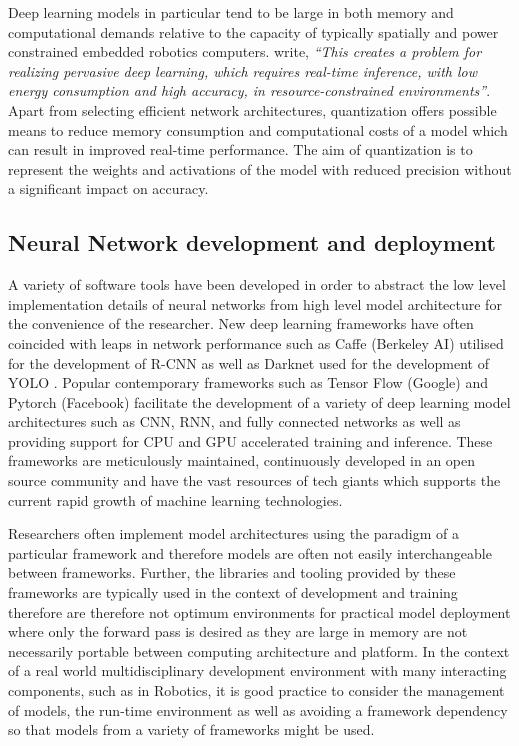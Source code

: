 \documentclass[a4paper,twoside,12pt]{report}
\begin{document}
Deep learning models in particular tend to be large in both memory and computational demands relative to the capacity of typically spatially and power constrained embedded robotics computers. \cite{quantization} write, \textit{``This creates a problem for realizing pervasive deep learning, which requires real-time inference, with low energy consumption and high accuracy, in resource-constrained environments''}. Apart from selecting efficient network architectures, quantization offers possible means to reduce memory consumption and computational costs of a model which can result in improved real-time performance. The aim of quantization is to represent the weights and activations of the model with reduced precision without a significant impact on accuracy. 

\subsection{Neural Network development and deployment}

A variety of software tools have been developed in order to abstract the low level implementation details of neural networks from high level model architecture for the convenience of the researcher. New deep learning frameworks have often coincided with leaps in network performance such as Caffe (Berkeley AI) \citep{caffe} utilised for the development of R-CNN \citep{rcnn} as well as Darknet used for the development of YOLO \citep{yolo}. Popular contemporary frameworks such as Tensor Flow (Google) \citep{tensorflow} and Pytorch (Facebook) \citep{pytorch} facilitate the development of a variety of deep learning model architectures such as CNN, RNN, and fully connected networks as well as providing support for CPU and GPU accelerated training and inference. These frameworks are meticulously maintained, continuously developed in an open source community and have the vast resources of tech giants which supports the current rapid growth of machine learning technologies.

Researchers often implement model architectures using the paradigm of a particular framework and therefore models are often not easily interchangeable between frameworks. Further, the libraries and tooling provided by these frameworks are typically used in the context of development and training therefore are therefore not optimum environments for practical model deployment where only the forward pass is desired as they are large in memory are not necessarily portable between computing architecture and platform. In the context of a real world multidisciplinary development environment with many interacting components, such as in Robotics, it is good practice to consider the management of models, the run-time environment as well as avoiding a framework dependency so that models from a variety of frameworks might be used. 
\end{document}
